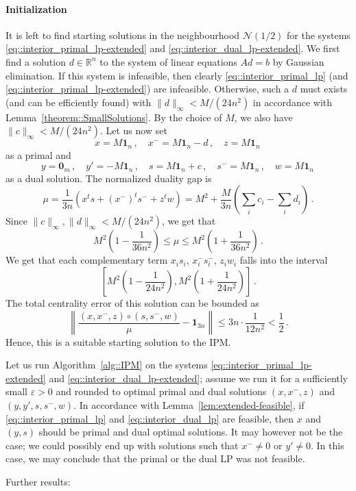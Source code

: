 \documentclass[12pt, showidx, twoside]{article}
\def\N{\mathbb{N}}
\def\R{\mathbb{R}}
\def\bo{\mathbf{1}}
\def\bn{\mathbf{0}}
\def\N{\mathcal{N}}
\begin{document}
{{{\paragraph{Initialization}
It is left to find starting solutions in the neighbourhood $\N(1/2)$ for the systems \eqref{eq::interior_primal_lp-extended} and  \eqref{eq::interior_dual_lp-extended}. 
We first find a solution  $d\in\R^n$ to the system of linear equations $Ad=b$  by Gaussian elimination. If this system is infeasible, then clearly \eqref{eq::interior_primal_lp} (and \eqref{eq::interior_primal_lp-extended}) are infeasible. Otherwise, such a $d$ must exists (and can be efficiently found) with $\|d\|_\infty<M/(24n^2)$
in accordance with Lemma~\ref{theorem::SmallSolutions}.
By the choice of $M$, we also have  $\|c\|_\infty<M/(24n^2)$.
Let us now set
\[
    x=M\bo_n\, ,\quad x^-=M\bo_n-d\, ,\quad z=M\bo_n\, 
\]
as a primal and
\[
 y=\bn_m\, ,\quad y'=-M\bo_n\, ,\quad s=M\bo_n+c\, ,\quad s^-=M\bo_n\, ,\quad w=M\bo_n\, 
\]
as a dual solution.
The normalized duality gap is
\[
\mu=    \frac{1}{3n}\left(x^t s+(x^-)^t s^-+z^tw\right)=M^2+\frac{M}{3n}\left(\sum_i c_i-\sum_i d_i\right)\, .
\]
Since $\|c\|_\infty,\|d\|_\infty<M/(24n^2)$, we get that
\[
    M^2\left (1-\frac{1}{36n^2}\right) \le \mu \le    M^2\left (1+\frac{1}{36n^2}\right) \, .
\]
We get that each complementary term $x_is_i$, $x_i^-s_i^-$, $z_i w_i$ falls into the interval
\[
   \left[M^2\left (1-\frac{1}{24n^2}\right),M^2\left (1+\frac{1}{24n^2}\right) \right] \, .
\]
The total centrality error of this solution can be bounded as
\[
\left\|\frac{(x,x^-,z)\circ (s,s^-,w)}{\mu}-\bo_{3n}\right\|\le 3n \cdot \frac{1}{12n^2}< \frac{1}{2}\, .
\]
Hence, this is a suitable starting solution to the IPM.


Let us run Algorithm~\ref{alg::IPM} on the systems \eqref{eq::interior_primal_lp-extended} and  \eqref{eq::interior_dual_lp-extended}; assume we run it for a sufficiently small $\varepsilon>0$ and rounded to optimal primal and dual solutions $(x,x^-,z)$ and $(y,y',s,s^-,w)$. In accordance with Lemma~\ref{lem:extended-feasible}, if \eqref{eq::interior_primal_lp} and \eqref{eq::interior_dual_lp} are feasible, then $x$ and $(y,s)$ should be primal and dual optimal solutions. It may however not be the case; we could possibly end up with solutions such that $x^-\neq 0$ or $y'\neq 0$. In this case, we may conclude that the primal or the dual LP was not feasible.



\iffalse

Further results:

}}}
\end{document}
